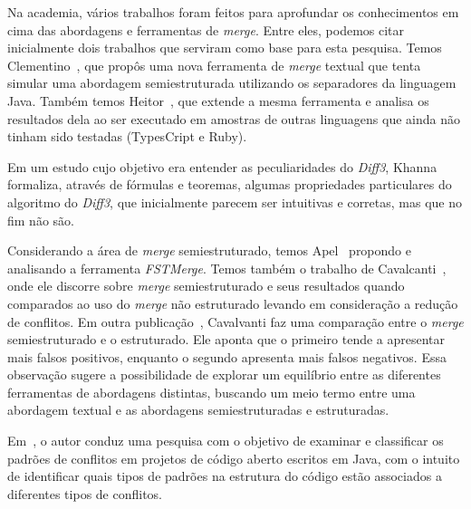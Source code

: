 Na academia, vários trabalhos foram feitos para aprofundar os conhecimentos em cima das abordagens e
ferramentas de \emph{merge}. Entre eles, podemos citar inicialmente dois trabalhos que serviram como base para esta pesquisa.
Temos Clementino~\cite{clem21}, que propôs uma nova ferramenta de \emph{merge} textual que tenta simular uma abordagem semiestruturada
utilizando os separadores da linguagem Java. Também temos Heitor~\cite{heitor21}, que extende a mesma ferramenta e analisa os
resultados dela ao ser executado em amostras de outras linguagens que ainda não tinham sido testadas (TypesCript e Ruby).

Em um estudo cujo objetivo era entender as peculiaridades do \emph{Diff3}, Khanna~\cite{khan07} formaliza, através de fórmulas e teoremas,
algumas propriedades particulares do algoritmo do \emph{Diff3}, que inicialmente parecem ser intuitivas e corretas, mas que no fim não
são.

Considerando a área de \emph{merge} semiestruturado, temos Apel~\cite{apel11} propondo e analisando a ferramenta \emph{FSTMerge}. Temos
também o trabalho de Cavalcanti~\cite{cavalcanti17}, onde ele
discorre sobre \emph{merge} semiestruturado e seus resultados quando comparados ao uso do \emph{merge} não
estruturado levando em consideração a redução de conflitos.
Em outra publicação~\cite{cavalcanti19}, Cavalvanti faz uma comparação entre o \emph{merge} semiestruturado e o estruturado.
Ele aponta que o primeiro tende a apresentar mais falsos positivos, enquanto o segundo apresenta mais falsos negativos.
Essa observação sugere a possibilidade de explorar um equilíbrio entre as diferentes ferramentas de abordagens
distintas, buscando um meio termo entre uma abordagem textual e as abordagens
semiestruturadas e estruturadas.

Em~\cite{accioly18}, o autor conduz uma pesquisa com o objetivo de examinar e classificar os
padrões de conflitos em projetos de código aberto escritos em Java,
com o intuito de identificar quais tipos de padrões na estrutura do
código estão associados a diferentes tipos de conflitos.

